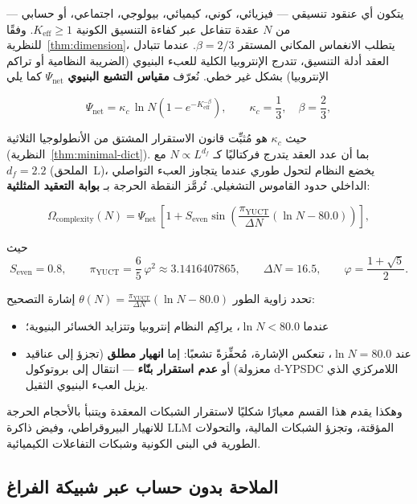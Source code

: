 \documentclass[11pt,a4paper]{article}
\newcommand{\Keff}{K_{\mathrm{eff}}}
\newcommand{\kappac}{\kappa_c}
\newcommand{\Seven}{S_{\mathrm{even}}}
\newcommand{\piYUCT}{\pi_{\mathrm{YUCT}}}
\begin{document}
	يتكون أي عنقود تنسيقي — فيزيائي، كوني، كيميائي، بيولوجي، اجتماعي، أو حسابي — من \(N\) عقدة تتفاعل عبر كفاءة التنسيق الكونية \(\Keff \ge 1\). وفقًا للنظرية~\ref{thm:dimension}، يتطلب الانغماس المكاني المستقر \(\beta = 2/3\). عندما تتبادل العقد أدلة التنسيق، تتدرج الإنتروبيا الكلية للعبء البنيوي (الضريبة النظامية أو تراكم الإنتروبيا) بشكل غير خطي. نُعرّف \textbf{مقياس التشبع البنيوي} \(\Psi_{\mathrm{net}}\) كما يلي
	
	\begin{equation}
		\Psi_{\mathrm{net}} = \kappac \, \ln N \left(1 - e^{-\Keff^{-\beta}}\right),
		\qquad \kappac = \frac{1}{3},\quad \beta = \frac{2}{3},
		\label{eq:Psi_net}
	\end{equation}
	
	حيث \(\kappac\) هو مُثبِّت قانون الاستقرار المشتق من الأنطولوجيا الثلاثية (النظرية~\ref{thm:minimal-dict}). بما أن عدد العقد يتدرج فركتاليًا كـ \(N \propto L^{d_f}\) مع \(d_f = 2.2\) (الملحق~L)، يخضع النظام لتحول طوري عندما يتجاوز العبء التواصلي الداخلي حدود القاموس التشغيلي. تُرمَّز النقطة الحرجة بـ \textbf{بوابة التعقيد المثلثية}:
	
	\begin{equation}
		\Omega_{\mathrm{complexity}}(N) = \Psi_{\mathrm{net}} \,
		\left[1 + \Seven \sin\!\left( \frac{\piYUCT}{\Delta N} \left(\ln N - 80.0\right) \right) \right],
		\label{eq:Omega_complexity}
	\end{equation}
	
	حيث
	\[
	\Seven = 0.8,\qquad
	\piYUCT = \frac{6}{5}\,\varphi^2 \approx 3.1416407865,\qquad
	\Delta N = 16.5,\qquad
	\varphi = \frac{1+\sqrt{5}}{2}.
	\]
	
	تحدد زاوية الطور \(\theta(N) = \frac{\piYUCT}{\Delta N} (\ln N - 80.0)\) إشارة التصحيح:
	\begin{itemize}
		\item عندما \(\ln N < 80.0\)، يراكِم النظام إنتروبيا وتتزايد الخسائر البنيوية؛
		\item عند \(\ln N = 80.0\)، تنعكس الإشارة، مُحفِّزةً تشعبًا: إما \textbf{انهيار مطلق} (تجزؤ إلى عناقيد معزولة) أو \textbf{عدم استقرار بنّاء} — انتقال إلى بروتوكول d-YPSDC اللامركزي الذي يزيل العبء البنيوي الثقيل.
	\end{itemize}
	
	وهكذا يقدم هذا القسم معيارًا شكليًا لاستقرار الشبكات المعقدة ويتنبأ بالأحجام الحرجة للانهيار البيروقراطي، وفيض ذاكرة LLM المؤقتة، وتجزؤ الشبكات المالية، والتحولات الطورية في البنى الكونية وشبكات التفاعلات الكيميائية.
	
	\subsection{الملاحة بدون حساب عبر شبيكة الفراغ}
	\label{subsec:computation-free}
	
\end{document}

